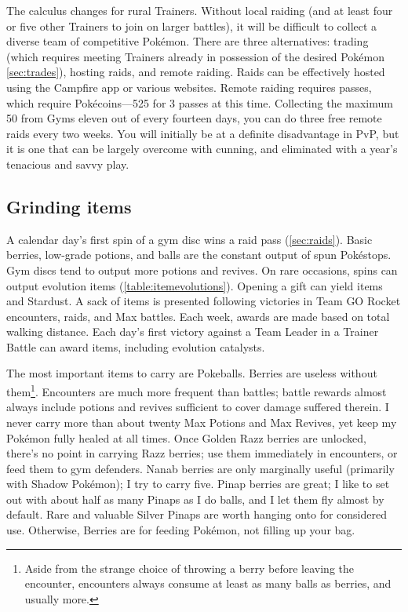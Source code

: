 The calculus changes for rural Trainers.
Without local raiding (and at least four or five other Trainers to join on larger battles),
  it will be difficult to collect a diverse team of competitive Pokémon.
There are three alternatives: trading (which requires meeting Trainers already in possession of the desired Pokémon
  \autoref{sec:trades}), hosting raids, and remote raiding.
Raids can be effectively hosted using the Campfire app or various websites.
Remote raiding requires passes, which require Pokécoins---525 for 3 passes at this time.
Collecting the maximum 50 from Gyms eleven out of every fourteen days, you can do
  three free remote raids every two weeks.
You will initially be at a definite disadvantage in PvP, but it is one that can
  be largely overcome with cunning, and eliminated with a year's tenacious
  and savvy play.

\subsection{Grinding items}
\label{subsec:grinditems}
A calendar day's first spin of a gym disc wins a raid pass (\autoref{sec:raids}).
Basic berries, low-grade potions, and balls are the constant output of spun Pokéstops.
Gym discs tend to output more potions and revives.
On rare occasions, spins can output evolution items (\autoref{table:itemevolutions}).
Opening a gift can yield items and Stardust.
A sack of items is presented following victories in Team GO Rocket encounters, raids, and Max battles.
Each week, awards are made based on total walking distance.
Each day's first victory against a Team Leader in a Trainer Battle can award items,
  including evolution catalysts.

The most important items to carry are Pokeballs.
Berries are useless without them\footnote{Aside from the strange choice of throwing a berry before leaving the encounter,
 encounters always consume at least as many balls as berries, and usually more.}.
Encounters are much more frequent than battles; battle rewards almost always
 include potions and revives sufficient to cover damage suffered therein.
I never carry more than about twenty Max Potions and Max Revives, yet keep my Pokémon fully healed at all times.
Once Golden Razz berries are unlocked, there's no point in carrying Razz berries;
  use them immediately in encounters, or feed them to gym defenders.
Nanab berries are only marginally useful (primarily with Shadow Pokémon); I try to carry five.
Pinap berries are great; I like to set out with about half as many Pinaps as I do balls,
  and I let them fly almost by default.
Rare and valuable Silver Pinaps are worth hanging onto for considered use.
Otherwise, Berries are for feeding Pokémon, not filling up your bag.

